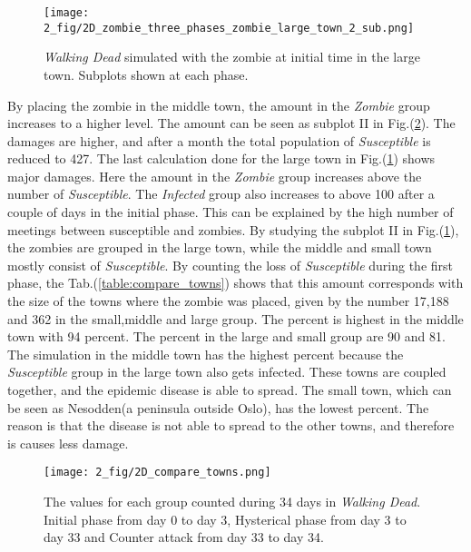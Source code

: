 \documentclass[%
twoside,                 %
final,                   %
chapterprefix=true,      %
open=right               %
10pt]{book}
\begin{document}
\begin{figure}[ht]
  \centerline{\texttt{[image: 2\_fig/2D\_zombie\_three\_phases\_zombie\_large\_town\_2\_sub.png]}}
  \caption{
  \label{fig:large_town} \emph{Walking Dead} simulated with the zombie at initial time in the large town. Subplots shown at each phase.
  }
\end{figure}




\vspace{3mm}




\vspace{3mm}


By placing the zombie in the middle town, the amount in the \emph{Zombie} group increases to a higher level. The amount can be seen as subplot II in Fig.(\ref{fig:compare_towns}). The damages are higher, and after a month the total population of \emph{Susceptible} is reduced to 427. The last calculation done for the large town in Fig.(\ref{fig:large_town}) shows major damages. Here the amount in the \emph{Zombie} group increases above the number of \emph{Susceptible}. The \emph{Infected} group also increases to above 100 after a couple of days in the initial phase. This can be explained by the high number of meetings between susceptible and zombies. By studying the subplot II in Fig.(\ref{fig:large_town}), the zombies are grouped in the large town, while the middle and small town mostly consist of \emph{Susceptible}. By counting the loss of \emph{Susceptible} during the first phase, the Tab.(\ref{table:compare_towns}) shows that this amount corresponds with the size of the towns where the zombie was placed, given by the number 17,188 and 362 in the small,middle and large group. The percent is highest in the middle town with 94 percent. The percent in the large and small group are 90 and 81.  The simulation in the middle town has the highest percent because the \emph{Susceptible} group in the large town also gets infected. These towns are coupled together, and the epidemic disease is able to spread. The small town, which can be seen as Nesodden(a peninsula outside Oslo), has the lowest percent. The reason is that the disease is not able to spread to the other towns, and therefore is causes less damage.  


\begin{figure}[ht]
  \centerline{\texttt{[image: 2\_fig/2D\_compare\_towns.png]}}
  \caption{
  \label{fig:compare_towns} The values for each group counted during 34 days in \emph{Walking Dead}. Initial phase from day 0 to day 3, Hysterical phase from day 3 to day 33 and Counter attack from day 33 to day 34.
  }
\end{figure}
\end{document}
